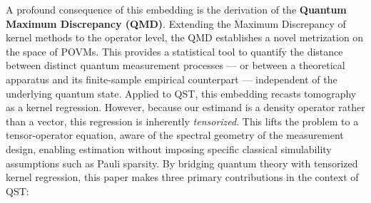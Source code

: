 \documentclass[noinfoline]{imsart}\setcounter{tocdepth}{2}
\theoremstyle{plain}
\begin{document}
A profound consequence of this embedding is the derivation of the \textbf{Quantum Maximum Discrepancy (QMD)}. Extending the Maximum Discrepancy of kernel methods \cite{gretton2012kernel, sriperumbudur2010hilbert, bach2022information} to the operator level, the QMD establishes a novel metrization on the space of POVMs. This provides a statistical tool to quantify the distance between distinct quantum measurement processes --- or between a theoretical apparatus and its finite-sample empirical counterpart --- independent of the underlying quantum state. 
Applied to QST, this embedding recasts tomography as a kernel regression. However, because our estimand is a density operator rather than a vector, this regression is inherently \emph{tensorized}. This lifts the problem to a tensor-operator equation, aware of the spectral geometry of the measurement design, enabling estimation without imposing specific classical simulability assumptions such as Pauli sparsity.
By bridging quantum theory with tensorized kernel regression, this paper makes three primary contributions in the context of QST:
\end{document}

